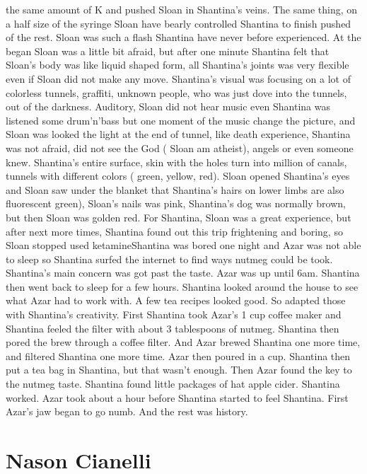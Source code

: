 \documentclass[12pt]{book}
\begin{document}
the same amount of K and pushed Sloan in Shantina's veins. The same thing, on a half size of the syringe Sloan have bearly controlled Shantina to finish pushed of the rest. Sloan was such a flash Shantina have never before experienced. At the began Sloan was a little bit afraid, but after one minute Shantina felt that Sloan's body was like liquid shaped form, all Shantina's joints was very flexible even if Sloan did not make any move. Shantina's visual was focusing on a lot of colorless tunnels, graffiti, unknown people, who was just dove into the tunnels, out of the darkness. Auditory, Sloan did not hear music even Shantina was listened some drum'n'bass but one moment of the music change the picture, and Sloan was looked the light at the end of tunnel, like death experience, Shantina was not afraid, did not see the God ( Sloan am atheist), angels or even someone knew. Shantina's entire surface, skin with the holes turn into million of canals, tunnels with different colors ( green, yellow, red). Sloan opened Shantina's eyes and Sloan saw under the blanket that Shantina's hairs on lower limbs are also fluorescent green), Sloan's nails was pink, Shantina's dog was normally brown, but then Sloan was golden red. For Shantina, Sloan was a great experience, but after next more times, Shantina found out this trip frightening and boring, so Sloan stopped used ketamineShantina was bored one night and Azar was not able to sleep so Shantina surfed the internet to find ways nutmeg could be took. Shantina's main concern was got past the taste. Azar was up until 6am. Shantina then went back to sleep for a few hours. Shantina looked around the house to see what Azar had to work with. A few tea recipes looked good. So adapted those with Shantina's creativity. First Shantina took Azar's 1 cup coffee maker and Shantina feeled the filter with about 3 tablespoons of nutmeg. Shantina then pored the brew through a coffee filter. And Azar brewed Shantina one more time, and filtered Shantina one more time. Azar then poured in a cup. Shantina then put a tea bag in Shantina, but that wasn't enough. Then Azar found the key to the nutmeg taste. Shantina found little packages of hat apple cider. Shantina worked. Azar took about a hour before Shantina started to feel Shantina. First Azar's jaw began to go numb. And the rest was history.



\chapter{Nason Cianelli}
\end{document}
